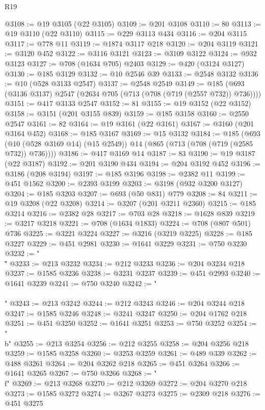 \begin{lexlean}{R19}
\begin{coremodule}
{{{{{{{{{{{@3108 := @19 @3105 (@22 @3105)
@3109 := @201 @3108
@3110 := 80
@3113 := @19 @3110 (@22 @3110)
@3115 := @229 @3113 @434
@3116 := @204 @3115
@3117 := @778 @11
@3119 := @1874 @3117 @218
@3120 := @204 @3119
@3121 := @3120 @452
@3122 := @3116 @3121
@3123 := @3109 @3122
@3124 := @932 @3123
@3127 := @708 (@1634 @705) @2403
@3129 := @420 (@3124 @3127)
@3130 := @185 @3129
@3132 := @10 @2546 @39
@3133 := @2548 @3132
@3136 := @10 (@528 @3133 @2547)
@3137 := @2548 @2549
@3149 := @185 (@693 (@3136 @3137) @2547 (@2634 @705 (@713 (@708 (@719 (@2557 @732)) @736))))
@3151 := @417 @3133 @2547
@3152 := 81
@3155 := @19 @3152 (@22 @3152)
@3158 := @3151 (@201 @3155 @839)
@3159 := @185 @3158
@3160 := @2550 @2547
@3161 := 82
@3164 := @19 @3161 (@22 @3161)
@3167 := @3160 (@201 @3164 @452)
@3168 := @185 @3167
@3169 := @15 @3132
@3184 := @185
    (@693 (@10 (@528 @3169 @14) (@15 @2549)) @14 (@865 (@713 (@708 (@719 (@2585 @732)) @736))))
@3186 := @417 @3169 @14
@3187 := 83
@3190 := @19 @3187 (@22 @3187)
@3192 := @201 @3190 @434
@3194 := @204 @3192 @452
@3196 := @3186 (@208 @3194)
@3197 := @185 @3196
@3198 := @2382 @11
@3199 := @451 @1562
@3200 := @2393 @3199
@3203 := @3198 (@932 @3200 @3127)
@3204 := @185 @3203
@3207 := @693 (@50 @831) @779
@3208 := 84
@3211 := @19 @3208 (@22 @3208)
@3214 := @3207 (@201 @3211 @2360)
@3215 := @185 @3214
@3216 := @2382 @28
@3217 := @703 @28
@3218 := @1628 @839
@3219 := @3217 @3218
@3221 := @708 (@1634 @1833)
@3224 := @708 (@807 @501) @736
@3225 := @3221 @3224
@3227 := @3216 (@3219 @3225)
@3228 := @185 @3227
@3229 := @451 @2981
@3230 := @1641 @3229
@3231 := @750 @3230
@3232 := "\\\""
@3233 := @213 @3232
@3234 := @212 @3233
@3236 := @204 @3234 @218
@3237 := @1585 @3236
@3238 := @3231 @3237
@3239 := @451 @2993
@3240 := @1641 @3239
@3241 := @750 @3240
@3242 := "\\\\"
@3243 := @213 @3242
@3244 := @212 @3243
@3246 := @204 @3244 @218
@3247 := @1585 @3246
@3248 := @3241 @3247
@3250 := @204 @1762 @218
@3251 := @451 @3250
@3252 := @1641 @3251
@3253 := @750 @3252
@3254 := "\\b"
@3255 := @213 @3254
@3256 := @212 @3255
@3258 := @204 @3256 @218
@3259 := @1585 @3258
@3260 := @3253 @3259
@3261 := @489 @339
@3262 := @488 @3261
@3264 := @204 @3262 @218
@3265 := @451 @3264
@3266 := @1641 @3265
@3267 := @750 @3266
@3268 := "\\f"
@3269 := @213 @3268
@3270 := @212 @3269
@3272 := @204 @3270 @218
@3273 := @1585 @3272
@3274 := @3267 @3273
@3275 := @2309 @218
@3276 := @451 @3275
}}}}}}}}}}}
\end{coremodule}
\end{lexlean}
